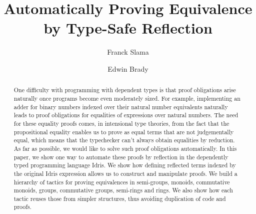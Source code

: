 \documentclass{llncs}
\begin{document}
%
\pagestyle{headings}  %

\mainmatter              %
%
\title{Automatically Proving Equivalence by Type-Safe Reflection}
%
%
\author{Franck Slama \and Edwin Brady}

\maketitle              %

\begin{abstract}
One difficulty with programming with dependent types is that proof obligations
arise naturally once programs become even moderately sized. For example,
implementing an adder for binary numbers indexed over their natural number
equivalents naturally leads to proof obligations for equalities of expressions
over natural numbers. The need for these equality proofs comes, in intensional
type theories, from the fact that the propositional equality enables us to
prove as equal terms that are not judgementally equal, which means that the
typechecker can't always obtain equalities by reduction.  As far as possible,
we would like to solve such proof obligations automatically. In this paper, we
show one way to automate these proofs by reflection in the dependently typed
programming language Idris.  We show how defining reflected terms indexed by
the original Idris expression allows us to construct and manipulate proofs. We
build a hierarchy of tactics for proving equivalences in semi-groups, monoids,
commutative monoids, groups, commutative groups, semi-rings and rings. We also
show how each tactic reuses those from simpler structures, thus avoiding
duplication of code and proofs.


\end{abstract}
%



\end{document}
